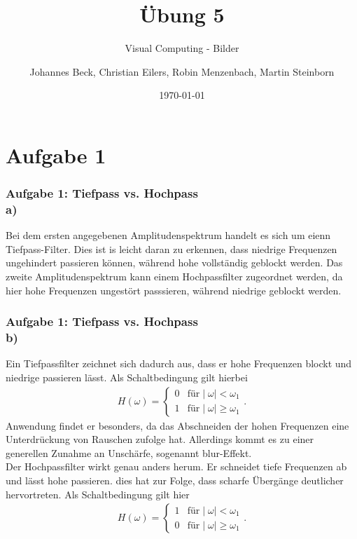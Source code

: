 \documentclass[accentcolor=tud9c,colorbacktitle,inverttitle,landscape,german,presentation,t]{tudbeamer}
\begin{document}
\title{\"Ubung 5}
\subtitle{Visual Computing - Bilder}

\author[Johannes Beck, Christian Eilers, Robin Menzenbach, Martin Steinborn]{Johannes Beck, Christian Eilers, Robin Menzenbach, Martin Steinborn}


\date{\today}

\begin{titleframe}
\end{titleframe}

\section{Aufgabe 1}
	\begin{frame}
		\frametitle{Aufgabe 1: Tiefpass vs. Hochpass \\ a)}
		Bei dem ersten angegebenen Amplitudenspektrum handelt es sich um eienn Tiefpass-Filter. Dies ist is leicht daran zu erkennen, dass niedrige Frequenzen ungehindert passieren k\"onnen, w\"ahrend hohe vollst\"andig geblockt werden.
		Das zweite Amplitudenspektrum kann einem Hochpassfilter zugeordnet werden, da hier hohe Frequenzen ungest\"ort passsieren, w\"ahrend niedrige geblockt werden.
	\end{frame}
	
	\begin{frame}
	\frametitle{Aufgabe 1: Tiefpass vs. Hochpass \\ b)} %
	Ein Tiefpassfilter zeichnet sich dadurch aus, dass er hohe Frequenzen blockt und niedrige passieren l\"asst. Als Schaltbedingung gilt hierbei
	\begin{align*}
	H(\omega) = \left\{\begin{array}{rl}0 & \textrm{f\"ur} \mid\omega\mid < \omega_1 \\ 1 & \textrm{f\"ur} \mid\omega\mid \geq \omega_1	\end{array}\right. .
\end{align*}
	Anwendung findet er besonders, da das Abschneiden der hohen Frequenzen  eine Unterdr\"uckung von Rauschen zufolge hat. Allerdings kommt es zu einer generellen Zunahme an Unsch\"arfe, sogenannt blur-Effekt.	\\	
	
	Der Hochpassfilter wirkt genau anders herum. Er schneidet tiefe Frequenzen ab und l\"asst hohe passieren. dies hat zur Folge, dass scharfe \"Uberg\"ange deutlicher hervortreten. Als Schaltbedingung gilt hier
	\begin{align*}
	H(\omega) = \left\{\begin{array}{rl}1 & \textrm{f\"ur} \mid\omega\mid < \omega_1 \\ 0 & \textrm{f\"ur} \mid\omega\mid \geq \omega_1	\end{array}\right. .
\end{align*}	
	\end{frame}
\end{document}
